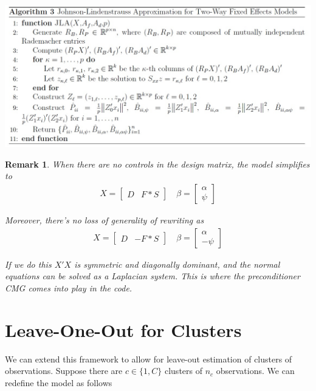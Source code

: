 \documentclass[12pt]{article}
\newtheorem{remark}{Remark}
\begin{document}
\includegraphics[scale=0.7]{JLA_algorithm.jpg}

\begin{remark}
When there are no controls in the design matrix, the model simplifies to
\begin{align*}
    X = \begin{bmatrix} D & F*S \end{bmatrix} \quad \beta = \begin{bmatrix} \alpha \\ \psi \end{bmatrix} 
\end{align*}

\noindent Moreover, there's no loss of generality of rewriting as
\begin{align*}
    X = \begin{bmatrix} D & -F*S \end{bmatrix} \quad \beta = \begin{bmatrix} \alpha \\ -\psi \end{bmatrix} 
\end{align*}

\noindent If we do this $X'X$ is symmetric and diagonally dominant, and the normal equations can be solved as a Laplacian system. This is where the preconditioner \textit{CMG} comes into play in the code.


\end{remark}


\section{Leave-One-Out for Clusters}

We can extend this framework to allow for leave-out estimation of clusters of observations. Suppose there are $c\in \{1,C\}$ clusters of $n_c$ observations. We can redefine the model as follows
\end{document}
